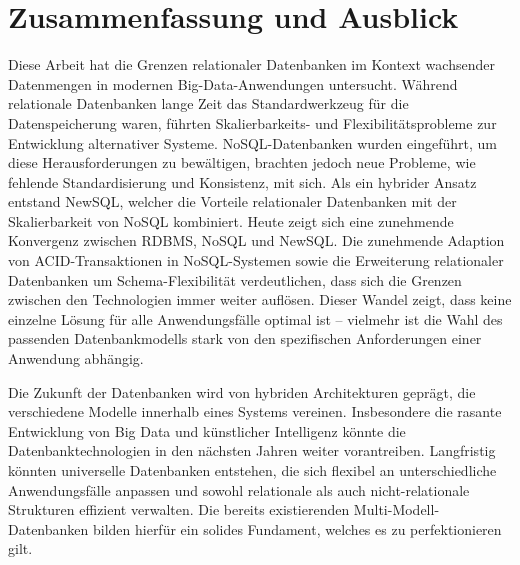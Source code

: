 \section{Zusammenfassung und Ausblick}

Diese Arbeit hat die Grenzen relationaler Datenbanken im Kontext wachsender Datenmengen in modernen Big-Data-Anwendungen untersucht. Während relationale Datenbanken lange Zeit das Standardwerkzeug für die Datenspeicherung waren, führten Skalierbarkeits- und Flexibilitätsprobleme zur Entwicklung alternativer Systeme. NoSQL-Datenbanken wurden eingeführt, um diese Herausforderungen zu bewältigen, brachten jedoch neue Probleme, wie fehlende Standardisierung und Konsistenz, mit sich. Als ein hybrider Ansatz entstand NewSQL, welcher die Vorteile relationaler Datenbanken mit der Skalierbarkeit von NoSQL kombiniert. Heute zeigt sich eine zunehmende Konvergenz zwischen RDBMS, NoSQL und NewSQL. Die zunehmende Adaption von ACID-Transaktionen in NoSQL-Systemen sowie die Erweiterung relationaler Datenbanken um Schema-Flexibilität verdeutlichen, dass sich die Grenzen zwischen den Technologien immer weiter auflösen. Dieser Wandel zeigt, dass keine einzelne Lösung für alle Anwendungsfälle optimal ist – vielmehr ist die Wahl des passenden Datenbankmodells stark von den spezifischen Anforderungen einer Anwendung abhängig.

Die Zukunft der Datenbanken wird von hybriden Architekturen geprägt, die verschiedene Modelle innerhalb eines Systems vereinen. Insbesondere die rasante Entwicklung von Big Data und künstlicher Intelligenz könnte die Datenbanktechnologien in den nächsten Jahren weiter vorantreiben. Langfristig könnten universelle Datenbanken entstehen, die sich flexibel an unterschiedliche Anwendungsfälle anpassen und sowohl relationale als auch nicht-relationale Strukturen effizient verwalten. Die bereits existierenden Multi-Modell-Datenbanken bilden hierfür ein solides Fundament, welches es zu perfektionieren gilt.